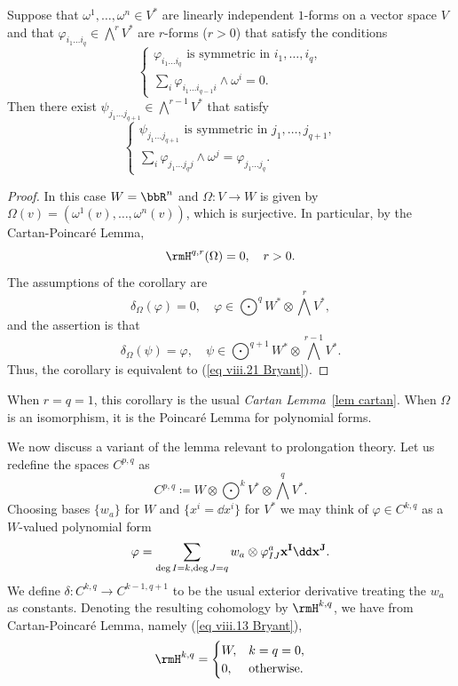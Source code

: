 \begin{cor}
    Suppose that $\omega^1,\ldots,\omega^n\in V^\ast$ are linearly independent $1$-forms on a vector space $V$ and that $\varphi_{i_1\ldots i_q}\in \bigwedge^r V^\ast$ are $r$-forms ($r>0$) that satisfy the conditions 
    \[\left\{
        \begin{array}{l}
            \varphi_{i_1\ldots i_q} \text{ is symmetric in }i_1,\ldots,i_q,\\
            \sum_i \varphi_{i_1\ldots i_{q-1} i}\wedge \omega^i=0.
        \end{array}
    \right.\]
    Then there exist $\psi_{j_1\ldots j_{q+1}}\in \bigwedge^{r-1}V^\ast$ that satisfy 
    \[\left\{
        \begin{array}{l}
            \psi_{j_1\ldots j_{q+1}} \text{ is symmetric in }j_1,\ldots,j_{q+1},\\
            \sum_i \varphi_{j_1\ldots j_q j}\wedge \omega^j=\varphi_{j_1\ldots j_q}.
        \end{array}
    \right.\]
\end{cor}
\begin{proof}
    In this case $W=\bbR^n$ and $\Omega:V\to W$ is given by $\Omega(v)=(\omega^1(v),\ldots,\omega^n(v))$, which is surjective. In particular, by the Cartan-Poincar\'e Lemma,
    \[\rmH^{q,r}(\Omega)=0,\quad r>0.\label{eq viii.21 Bryant}\]
    The assumptions of the corollary are 
    \[\delta_\Omega(\varphi)=0,\quad \varphi\in \bigodot^q W^\ast\otimes \bigwedge^r V^\ast,\]
    and the assertion is that 
    \[\delta_\Omega (\psi)=\varphi,\quad \psi\in \bigodot^{q+1}W^\ast\otimes \bigwedge^{r-1}V^\ast.\]
    Thus, the corollary is equivalent to (\ref{eq viii.21 Bryant}).
\end{proof}

When $r=q=1$, this corollary is the usual \emph{Cartan Lemma}~\ref{lem cartan}. When $\Omega$ is an isomorphism, it is the Poincar\'e Lemma for polynomial forms.

We now discuss a variant of the lemma relevant to prolongation theory. Let us redefine the spaces $C^{p,q}$ as 
\[C^{p,q}\coloneqq W\otimes \bigodot^k V^\ast\otimes \bigwedge^q V^\ast.\]
Choosing bases $\{w_a\}$ for $W$ and $\{x^i=\dd x^i\}$ for $V^\ast$ we may think of $\varphi\in C^{k,q}$ as a $W$-valued polynomial form 
\[\varphi=\sum_{\deg I=k,\deg J=q}w_a\otimes \varphi^a_{IJ}\bf{x}^I \dd \bf{x}^J.\]
We define $\delta:C^{k,q}\to C^{k-1,q+1}$ to be the usual exterior derivative treating the $w_a$ as constants. Denoting the resulting cohomology by $\rmH^{k,q}$, we have from Cartan-Poincar\'e Lemma, namely (\ref{eq viii.13 Bryant}), 
\[\rmH^{k,q}=\begin{cases}
    W,& k=q=0,\\
    0, & \text{otherwise}.
\end{cases}\]

